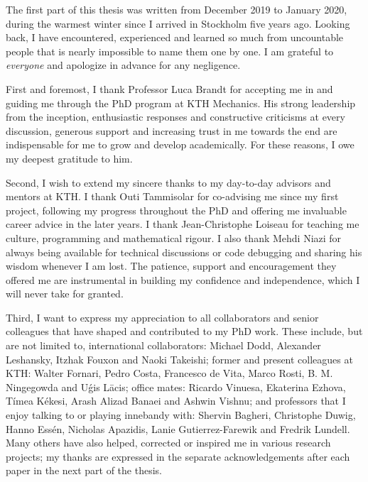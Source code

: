 \begin{acknowledgements}

  The first part of this thesis was written from December 2019 to January 2020, during the warmest winter since I arrived in Stockholm five years ago.
  Looking back, I have encountered, experienced and learned so much from uncountable people that is nearly impossible to name them one by one.
  I am grateful to \emph{everyone} and apologize in advance for any negligence.

  First and foremost, I thank Professor Luca Brandt for accepting me in and guiding me through the PhD program at KTH Mechanics.
  His strong leadership from the inception,
  enthusiastic responses and constructive criticisms at every discussion,
  generous support and increasing trust in me towards the end are indispensable for me to grow and develop academically.
  For these reasons, I owe my deepest gratitude to him.

  Second, I wish to extend my sincere thanks to my day-to-day advisors and mentors at KTH.
  I thank Outi Tammisolar for co-advising me since my first project, following my progress throughout the PhD
  and offering me invaluable career advice in the later years.
  I thank Jean-Christophe Loiseau for teaching me culture, programming and mathematical rigour.
  I also thank Mehdi Niazi for always being available for technical discussions or code debugging and sharing his wisdom whenever I am lost.
  The patience, support and encouragement they offered me are instrumental in building my confidence and independence, which I will never take for granted.

  Third, I want to express my appreciation to all collaborators and senior colleagues that have shaped and contributed to my PhD work.
  These include, but are not limited to, international collaborators: Michael Dodd, Alexander Leshansky, Itzhak Fouxon and Naoki Takeishi;
  former and present colleagues at KTH: Walter Fornari, Pedro Costa, Francesco de Vita, Marco Rosti, B. M. Ningegowda and U\'{g}is L\={a}cis;
  office mates: Ricardo Vinuesa, Ekaterina Ezhova, Tímea Kékesi, Arash Alizad Banaei and Ashwin Vishnu;
  and professors that I enjoy talking to or playing innebandy with:
  Shervin Bagheri, Christophe Duwig, Hanno Essén, Nicholas Apazidis, Lanie Gutierrez-Farewik and Fredrik Lundell.
  Many others have also helped, corrected or inspired me in various research projects;
  my thanks are expressed in the separate acknowledgements after each paper in the next part of the thesis.
  

\end{acknowledgements}
